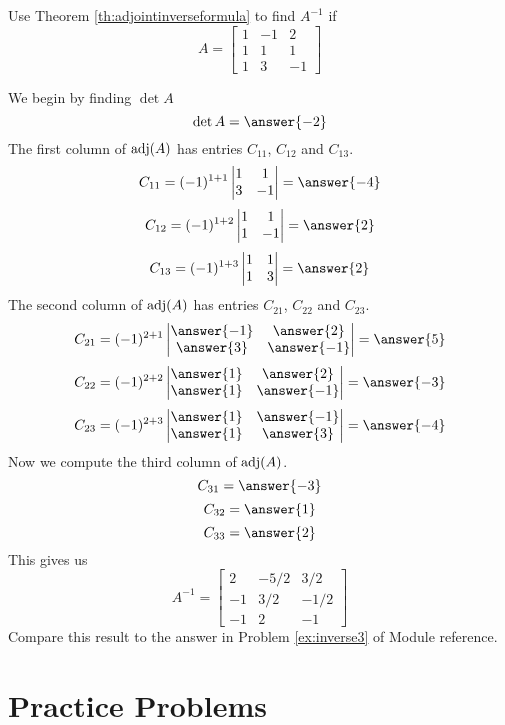 \documentclass{ximera}
\begin{document}
\begin{example}
Use Theorem \ref{th:adjointinverseformula} to  find $A^{-1}$ if 
$$A=\begin{bmatrix}1&-1&2\\1&1&1\\1&3&-1\end{bmatrix}$$
\begin{explanation}
We begin by finding $\det{A}$
$$\det{A}=\answer{-2}$$
The first column of $\textnormal{adj}(A)$ has entries $C_{11}$, $C_{12}$ and $C_{13}$.
$$C_{11}=(-1)^{1+1}\begin{vmatrix}1&1\\3&-1\end{vmatrix}=\answer{-4}$$
$$C_{12}=(-1)^{1+2}\begin{vmatrix}1&1\\1&-1\end{vmatrix}=\answer{2}$$
$$C_{13}=(-1)^{1+3}\begin{vmatrix}1&1\\1&3\end{vmatrix}=\answer{2}$$
The second column of $\textnormal{adj}(A)$ has entries $C_{21}$, $C_{22}$ and $C_{23}$.
$$C_{21}=(-1)^{2+1}\begin{vmatrix}\answer{-1}&\answer{2}\\\answer{3}&\answer{-1}\end{vmatrix}=\answer{5}$$
$$C_{22}=(-1)^{2+2}\begin{vmatrix}\answer{1}&\answer{2}\\\answer{1}&\answer{-1}\end{vmatrix}=\answer{-3}$$
$$C_{23}=(-1)^{2+3}\begin{vmatrix}\answer{1}&\answer{-1}\\\answer{1}&\answer{3}\end{vmatrix}=\answer{-4}$$
Now we compute the third column of $\textnormal{adj}(A)$.
$$C_{31}=\answer{-3}$$
$$C_{32}=\answer{1}$$
$$C_{33}=\answer{2}$$
This gives us
$$A^{-1}=\begin{bmatrix}2&-5/2&3/2\\-1&3/2&-1/2\\-1&2&-1\end{bmatrix}$$
Compare this result to the answer in Problem \ref{ex:inverse3} of Module {\color{red} reference}.

\end{explanation}
\end{example}

\section*{Practice Problems}
\end{document}
